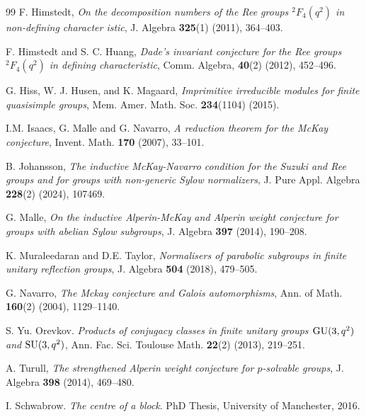 \documentclass[11pt,a4paper]{article}
\numberwithin{equation}{section}
\theoremstyle{definition}
\theoremstyle{remark}
\begin{document}
\begin{thebibliography}{99}
F. Himstedt, \emph{On the decomposition numbers of the Ree groups ${}^2F_4(q^2)$ in non-defining character
istic}, J. Algebra \textbf{325}(1) (2011), 364--403.

F. Himstedt and S. C. Huang, \emph{Dade's invariant conjecture for the Ree groups ${}^2F_4(q^2)$ in defining characteristic}, Comm. Algebra, \textbf{40}(2) (2012), 452--496.

G. Hiss, W. J. Husen, and K. Magaard, \emph{Imprimitive irreducible modules for finite quasisimple groups}, Mem. Amer. Math. Soc. \textbf{234}(1104) (2015).

I.M. Isaacs, G. Malle and G. Navarro, \emph{A reduction theorem for the McKay conjecture}, Invent. Math. \textbf{170} (2007), 33--101.

B. Johansson, \emph{The inductive McKay-Navarro condition for the Suzuki and Ree groups and for groups with non-generic Sylow normalizers}, J. Pure Appl. Algebra \textbf{228}(2)  (2024), 107469. %


G. Malle, \emph{On the inductive Alperin-McKay and Alperin weight conjecture for groups with abelian Sylow subgroups},
J. Algebra \textbf{397} (2014), 190--208.

K. Muraleedaran and D.E. Taylor, \emph{Normalisers of parabolic subgroups in finite unitary reflection groups}, 
J. Algebra \textbf{504} (2018), 479--505.


G. Navarro, \emph{The Mckay conjecture and Galois automorphisms}, Ann. of Math. {\bf 160}(2) (2004), 1129--1140.

 S. Yu. Orevkov. \emph{Products of conjugacy classes in finite unitary groups ${\rm GU}(3,q^2)$ and ${\rm SU}(3,q^2)$},
 Ann. Fac. Sci. Toulouse Math. \textbf{22}(2) (2013), 219--251.

A. Turull, \emph{The strengthened Alperin weight conjecture for $p$-solvable groups}, J. Algebra \textbf{398} (2014), 469--480.

I. Schwabrow. \emph{The centre of a block}. PhD Thesis, University of Manchester, 2016.



\end{thebibliography}
\end{document}
